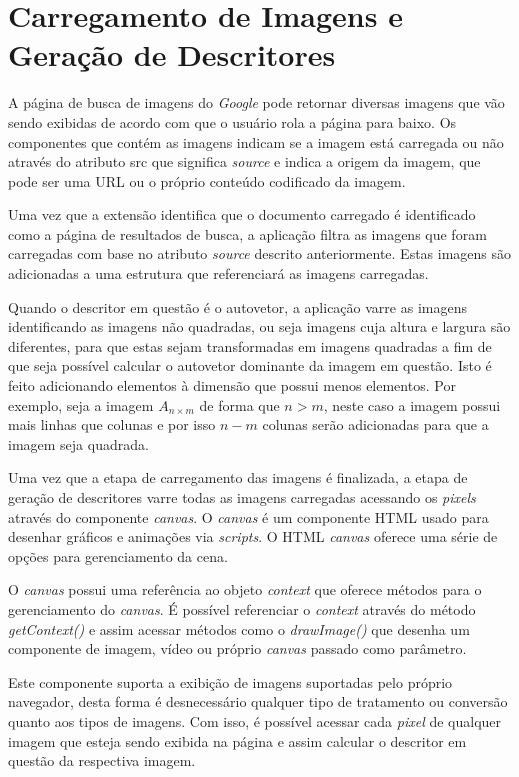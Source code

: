 \section{Carregamento de Imagens e Geração de Descritores}
A página de busca de imagens do \emph{Google} pode retornar diversas imagens que vão sendo exibidas de acordo com que o usuário rola a página para baixo. Os componentes que contém as imagens indicam se a imagem está carregada ou não através do atributo src que significa \emph{source} e indica a origem da imagem, que pode ser uma URL ou o próprio conteúdo codificado da imagem. 

Uma vez que a extensão identifica que o documento carregado é identificado como a página de resultados de busca, a aplicação filtra as imagens que foram carregadas com base no atributo \emph{source} descrito anteriormente. Estas imagens são adicionadas a uma estrutura que referenciará as imagens carregadas.

Quando o descritor em questão é o autovetor, a aplicação varre as imagens identificando as imagens não quadradas, ou seja imagens cuja altura e largura são diferentes, para que estas sejam transformadas em imagens quadradas a fim de que seja possível calcular o autovetor dominante da imagem em questão. Isto é feito adicionando elementos à dimensão que possui menos elementos. Por exemplo, seja a imagem $A_{n \times m}$ de forma que $n > m$, neste caso a imagem possui mais linhas que colunas e por isso $n - m$ colunas serão adicionadas para que a imagem seja quadrada.

Uma vez que a etapa de carregamento das imagens é finalizada, a etapa de geração de descritores varre todas as imagens carregadas acessando os \emph{pixels} através do componente \emph{canvas}. O \emph{canvas} é um componente HTML usado para desenhar gráficos e animações via \emph{scripts}. O HTML \emph{canvas} oferece uma série de opções para gerenciamento da cena. 

O \emph{canvas} possui uma referência ao objeto \emph{context} que oferece métodos para o gerenciamento do \emph{canvas}. É possível referenciar o \emph{context} através do método \emph{getContext()} e assim acessar métodos como o \emph{drawImage()} que desenha um componente de imagem, vídeo ou próprio \emph{canvas} passado como parâmetro. 

Este componente suporta a exibição de imagens suportadas pelo próprio navegador, desta forma é desnecessário qualquer tipo de tratamento ou conversão quanto aos tipos de imagens. Com isso, é possível acessar cada \emph{pixel} de qualquer imagem que esteja sendo exibida na página e assim calcular o descritor em questão da respectiva imagem.

